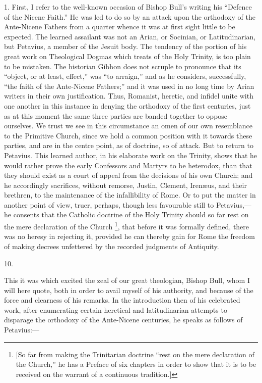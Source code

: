 1. First, I refer to the well-known occasion of Bishop Bull's
writing his ``Defence of the Nicene Faith.'' He was led to do
so by an attack upon the orthodoxy of the Ante-Nicene Fathers from a
quarter whence it was at first sight little to be expected. The
learned assailant was not an Arian, or Socinian, or Latitudinarian,
but Petavius, a member of the Jesuit body. The tendency of the portion
of his great work on Theological Dogmas which treats of the Holy
Trinity, is too plain to be mistaken. The historian Gibbon does not
scruple to pronounce that its ``object, or at least, effect,''
was ``to arraign,'' and as he considers, successfully,
``the faith of the Ante-Nicene Fathers;'' and it was used in
no long time by Arian writers in their own justification. Thus,
Romanist, heretic, and infidel unite with one another in this instance
in denying the orthodoxy of the first centuries, just as at this
moment the same three parties are banded together to oppose ourselves.
We trust we see in this circumstance an omen of our own resemblance to
the Primitive Church, since we hold a common position with it towards
these parties, and are in the centre point, as of doctrine, so of
attack. But to return to Petavius. This learned author, in his
elaborate work on the Trinity, shows that he would rather prove the
early Confessors and Martyrs to be heterodox, than that they should
exist as a court of appeal from the decisions of his own Church; and
he accordingly sacrifices, without remorse, Justin, Clement, Irenæus,
and their brethren, to the maintenance of the infallibility of Rome.
Or to put the matter in another point of view, truer, perhaps, though
less favourable still to Petavius,—he consents that the Catholic
doctrine of the Holy Trinity should so far rest on the mere
declaration of the Church \footnote{[So far from making the Trinitarian
doctrine ``rest on the mere declaration of the Church,'' he
has a Preface of six chapters in order to show that it is to be
received on the warrant of a continuous tradition.]},
that before it was formally defined, there was no heresy in
rejecting it, provided he can thereby gain for Rome the freedom of
making decrees unfettered by the recorded judgments of Antiquity.

10.

This it was which excited the zeal of our great theologian, Bishop
Bull, whom I will here quote, both in order to avail myself of his
authority, and because of the force and clearness of his remarks. In
the introduction then of his celebrated work, after enumerating
certain heretical and latitudinarian attempts to disparage the
orthodoxy of the Ante-Nicene centuries, he speaks as follows of
Petavius:—

